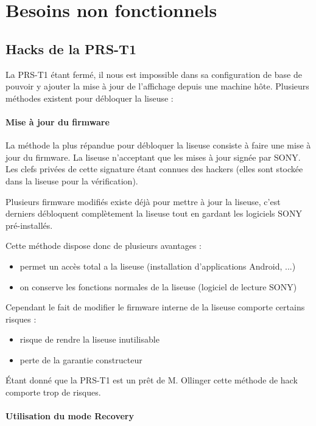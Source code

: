 \chapter{Besoins non fonctionnels}
\section{Hacks de la PRS-T1}

La PRS-T1 étant fermé, il nous est impossible dans sa configuration de base de pouvoir y ajouter la mise à jour 
de l'affichage depuis une machine hôte.
Plusieurs méthodes existent pour débloquer la liseuse : 

\subsubsection{Mise à jour du firmware}

La méthode la plus répandue pour débloquer la liseuse consiste à faire une mise à jour du firmware.
La liseuse n'acceptant que les mises à jour signée par SONY. Les clefs privées de cette signature étant connues des hackers (elles sont stockée dans la liseuse pour la vérification).

Plusieurs firmware modifiés existe déjà pour mettre à jour la liseuse, c'est derniers débloquent complètement la liseuse tout en gardant les logiciels SONY pré-installés.

Cette méthode dispose donc de plusieurs avantages : 
	\begin{itemize}
		\item permet un accès total a la liseuse (installation d'applications Android, ...)
		\item on conserve les fonctions normales de la liseuse (logiciel de lecture SONY)
	\end{itemize}
Cependant le fait de modifier le firmware interne de la liseuse comporte certains risques : 
	\begin{itemize}
		\item risque de rendre la liseuse inutilisable
		\item perte de la garantie constructeur
	\end{itemize}

Étant donné que la PRS-T1 est un prêt de M. Ollinger cette méthode de hack comporte trop de risques.

\subsubsection{Utilisation du mode Recovery}

